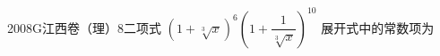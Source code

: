
\begin{problem}{2008}{G}{江西卷（理）}{8}{二项式}
$ \left( 1 + \sqrt[3]{x} \right)^6 \left( 1 + \dfrac{1}{\sqrt[3]{x}} \right)^{10} $ 展开式中的常数项为
\begin{choices}
\end{choices}
\end{problem}

\begin{answer}

\end{answer}

\begin{solutions}

\end{solutions}